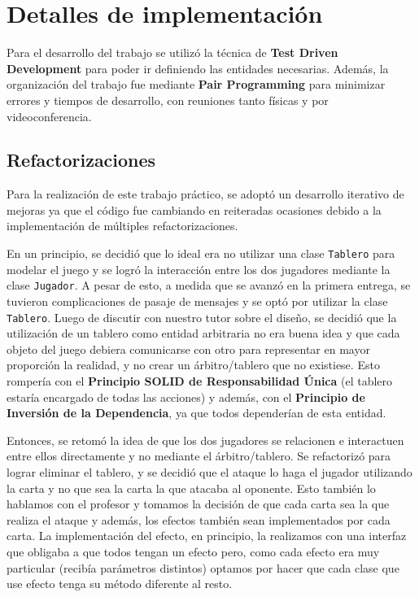 	\section{Detalles de implementación}
	
	Para el desarrollo del trabajo se utilizó la técnica de \textbf{Test Driven Development} para poder ir definiendo las entidades necesarias. Además, la organización del trabajo fue mediante \textbf{Pair Programming} para minimizar errores y tiempos de desarrollo, con reuniones tanto físicas y por videoconferencia.
	
	\subsection{Refactorizaciones}
	
	Para la realización de este trabajo práctico, se adoptó un desarrollo iterativo de mejoras ya que el código fue cambiando en reiteradas ocasiones debido a la implementación de múltiples refactorizaciones. 
	
	En un principio, se decidió que lo ideal era no utilizar una clase \texttt{Tablero} para modelar el juego y se logró la interacción entre los dos jugadores mediante la clase \texttt{Jugador}. A pesar de esto, a medida que se avanzó en la primera entrega, se tuvieron complicaciones de pasaje de mensajes y se optó por utilizar la clase \texttt{Tablero}. Luego de discutir con nuestro tutor sobre el diseño, se decidió que la utilización de un tablero como entidad arbitraria no era buena idea y que cada objeto del juego debiera comunicarse con otro para representar en mayor proporción la realidad, y no crear un árbitro/tablero que no existiese. Esto rompería con el \textbf{Principio SOLID de Responsabilidad Única} (el tablero estaría encargado de todas las acciones) y además, con el \textbf{Principio de Inversión de la Dependencia}, ya que todos dependerían de esta entidad.
	
	Entonces, se retomó la idea de que los dos jugadores se relacionen e interactuen entre ellos directamente y no mediante el árbitro/tablero. Se refactorizó para lograr eliminar el tablero, y se decidió que el ataque lo haga el jugador utilizando la carta y no que sea la carta la que atacaba al oponente. Esto también lo hablamos con el profesor y tomamos la decisión de que cada carta sea la que realiza el ataque y además, los efectos también sean implementados por cada carta. La implementación del efecto, en principio, la realizamos con una interfaz que obligaba a que todos tengan un efecto pero, como cada efecto era muy particular (recibía parámetros distintos) optamos por hacer que cada clase que use efecto tenga su método diferente al resto.
	
